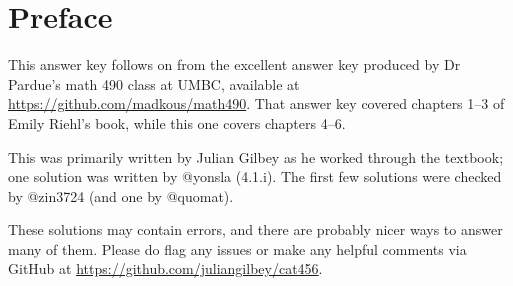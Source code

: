 \documentclass[main]{subfiles}
\begin{document}
\chapter*{Preface}

This answer key follows on from the excellent answer key produced by
Dr Pardue's math 490 class at UMBC, available at
\url{https://github.com/madkous/math490}.  That answer key covered
chapters 1--3 of Emily Riehl's book, while this one covers chapters
4--6.

This was primarily written by Julian Gilbey as he worked through the
textbook; one solution was written by @yonsla (4.1.i).  The first few
solutions were checked by @zin3724 (and one by @quomat).

These solutions may contain errors, and there are probably nicer ways
to answer many of them.  Please do flag any issues or make any helpful
comments via GitHub at \url{https://github.com/juliangilbey/cat456}.
\end{document}
